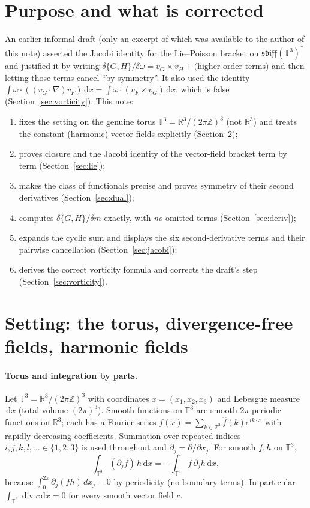 \documentclass[11pt]{article}
\theoremstyle{definition}
\newcommand{\T}{\mathbb{T}^3}
\newcommand{\R}{\mathbb{R}}
\newcommand{\Z}{\mathbb{Z}}
\newcommand{\dd}{\,\mathrm{d}x}
\renewcommand{\div}{\operatorname{div}}
\begin{document}
\section{Purpose and what is corrected}
An earlier informal draft (only an excerpt of which was available to the author of this note)
asserted the Jacobi identity for the Lie--Poisson bracket on $\mathfrak{sdiff}(\T)^*$ and justified it
by writing $\delta\{G,H\}/\delta\omega = v_G\times v_H + \text{(higher-order terms)}$ and then letting
those terms cancel ``by symmetry''. It also used the identity
$\int\omega\cdot((v_G\cdot\nabla)v_F)\dd=\int\omega\cdot(v_F\times v_G)\dd$, which is false
(Section~\ref{sec:vorticity}). This note:
\begin{enumerate}
\item fixes the setting on the genuine torus $\T=\R^3/(2\pi\Z)^3$ (not $\R^3$) and treats the constant
(harmonic) vector fields explicitly (Section~\ref{sec:setting});
\item proves closure and the Jacobi identity of the vector-field bracket term by term
(Section~\ref{sec:lie});
\item makes the class of functionals precise and proves symmetry of their second derivatives
(Section~\ref{sec:dual});
\item computes $\delta\{G,H\}/\delta m$ exactly, with \emph{no} omitted terms
(Section~\ref{sec:deriv});
\item expands the cyclic sum and displays the six second-derivative terms and their pairwise
cancellation (Section~\ref{sec:jacobi});
\item derives the correct vorticity formula and corrects the draft's step
(Section~\ref{sec:vorticity}).
\end{enumerate}

\section{Setting: the torus, divergence-free fields, harmonic fields}\label{sec:setting}
\paragraph{Torus and integration by parts.}
Let $\T=\R^3/(2\pi\Z)^3$ with coordinates $x=(x_1,x_2,x_3)$ and Lebesgue measure $\dd$ (total volume
$(2\pi)^3$). Smooth functions on $\T$ are smooth $2\pi$-periodic functions on $\R^3$; each has a
Fourier series $f(x)=\sum_{k\in\Z^3}\hat f(k)e^{ik\cdot x}$ with rapidly decreasing coefficients.
Summation over repeated indices $i,j,k,l,\ldots\in\{1,2,3\}$ is used throughout and $\partial_j=\partial/\partial x_j$.
For smooth $f,h$ on $\T$,
\begin{equation}\label{eq:ibp}
\int_{\T}(\partial_j f)\,h\dd=-\int_{\T}f\,\partial_j h\dd ,
\end{equation}
because $\int_0^{2\pi}\partial_j(fh)\,dx_j=0$ by periodicity (no boundary terms). In particular
$\int_{\T}\div c\dd=0$ for every smooth vector field $c$.
\end{document}
